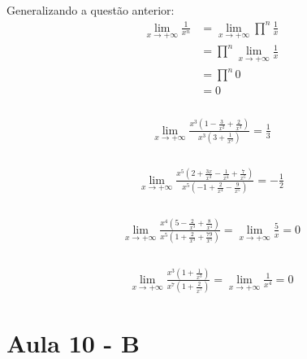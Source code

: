 \documentclass[12pt]{article}
\theoremstyle{definition}
\begin{document}
\subsubsection{}
Generalizando a questão anterior:
\begin{align*}
	\lim_{x\rightarrow + \infty} \frac{1}{x^n}
	&= \lim_{x\rightarrow + \infty} \prod^n \frac{1}{x} \\
	&= \prod^n \lim_{x\rightarrow +\infty} \frac{1}{x}\\
	&= \prod^n 0 \\ 
	&= 0
\end{align*}

\subsection{}
\subsubsection{}
\begin{align*}
	\lim_{x\rightarrow +\infty} \frac{x^3(1 - \frac{3}{x^2} + \frac{2}{x^3} )}{x^3(3+\frac{1}{x^3})} = \frac{1}{3}
\end{align*}
\subsubsection{}
\begin{align*}
	\lim_{x\rightarrow +\infty} \frac{x^5(2+\frac{3x}{x^3}-\frac{1}{x^4}+\frac{7}{x^5})}{x^5(-1+\frac{2}{x^4}-\frac{9}{x^5})} = -\frac{1}{2}
\end{align*}
\subsubsection{}
\begin{align*}
	\lim_{x\rightarrow +\infty} \frac{x^4(5-\frac{2}{x^3}+\frac{8}{x^4})}{x^5(1+\frac{2}{x^3}+\frac{79}{x^5})} = \lim_{x\rightarrow +\infty} \frac{5}{x} = 0
\end{align*}
\subsubsection{}
\begin{align*}
	\lim_{x\rightarrow +\infty} \frac{x^3(1+\frac{1}{x^3})}{x^7(1+\frac{2}{x^7})} = \lim_{x\rightarrow +\infty} \frac{1}{x^4} = 0
\end{align*}

\part*{Aula 10 - B}%
\end{document}
